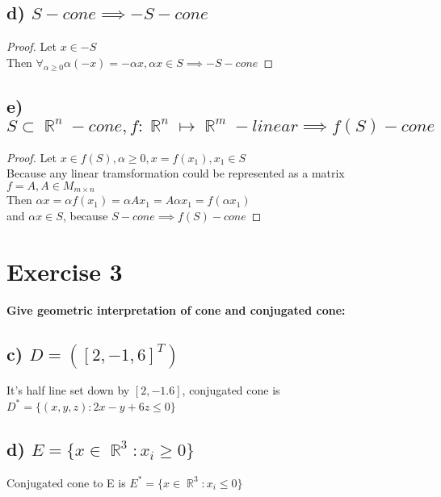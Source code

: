 \documentclass[12pt]{article}
\DeclareMathOperator{\R}{\mathbb{R}}
\begin{document}
\subsection*{d) \( S - cone \implies -S - cone\)}
\begin{proof}
    Let \(x \in -S\)\\
    Then \( \forall_{\alpha \geq 0} \alpha(-x)=-\alpha x, \alpha x \in S \implies -S -cone\)
\end{proof}
\subsection*{e) \( S \subset \R^n - cone, f:\R^n \mapsto \R^m -linear  \implies f(S)- cone\)}
\begin{proof}
    Let \(x \in f(S), \alpha \geq 0, x=f(x_1), x_1 \in S\)\\
    Because any linear tramsformation could be represented as a matrix  \(f=A, A \in M_{m \times n}\)\\
    Then \(\alpha x=\alpha f(x_1)=\alpha A x_1 =A \alpha x_1= f(\alpha x_1)\)\\
    and \(\alpha x \in S\), because \(S - cone \implies f(S)-cone\)
\end{proof}
    
\section*{Exercise 3}
{\bfseries Give geometric interpretation of cone and conjugated cone:}
\subsection*{c) \(D=([2,-1, 6]^T)\)}
It's half line set down by \([2, -1.6]\), conjugated cone is \(D^*=\{(x, y, z):2x-y+6z \leq 0\}\)
\subsection*{d) \(E=\{x \in \R^3: x_i\geq 0 \}\)}
Conjugated cone to E is \( E^*=\{x \in \R^3: x_i\leq 0 \} \)
\end{document}
